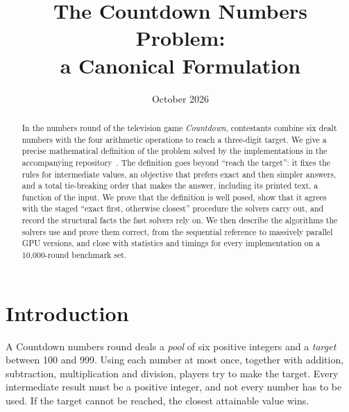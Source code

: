 \documentclass[11pt,a4paper]{article}
\title{The Countdown Numbers Problem:\\ a Canonical Formulation}
\author{}
\date{October 2026}
\theoremstyle{definition}
\theoremstyle{remark}
\begin{document}
\maketitle

\begin{abstract}
In the numbers round of the television game \emph{Countdown}, contestants combine six dealt numbers with
the four arithmetic operations to reach a three-digit target. We give a precise mathematical definition
of the problem solved by the implementations in the accompanying repository~\cite{repo}. The definition goes beyond ``reach the
target'': it fixes the rules for intermediate values, an objective that prefers exact and then
simpler answers, and a total tie-breaking order that makes the answer, including its printed text,
a function of the input. We prove that the definition is well posed, show that it agrees with the
staged ``exact first, otherwise closest'' procedure the solvers carry out, and record the structural facts
the fast solvers rely on. We then describe the algorithms the solvers use and prove them correct, from the
sequential reference to massively parallel GPU versions, and close with statistics and timings for every implementation on a 10{,}000-round benchmark set.
\end{abstract}

\section{Introduction}

A Countdown numbers round deals a \emph{pool} of six positive integers and a \emph{target} between
100 and 999. Using each number at most once, together with addition, subtraction, multiplication and
division, players try to make the target. Every intermediate result must be a positive integer, and not
every number has to be used. If the target cannot be reached, the closest attainable value wins.
\end{document}

